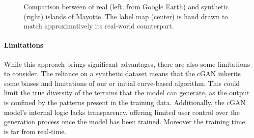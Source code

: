 \begin{figure}[t]
    \caption{Comparison between of real (left, from Google Earth) and synthetic (right) islands of Mayotte. The label map (center) is hand drawn to match approximatively its real-world counterpart. }
    \label{fig:coral-island_example-Mayotte}
\end{figure}




\paragraph{Limitations} 
While this approach brings significant advantages, there are also some limitations to consider. The reliance on a synthetic dataset means that the cGAN inherits some biases and limitations of our or initial curve-based algorithm. This could limit the true diversity of the terrains that the model can generate, as the output is confined by the patterns present in the training data. Additionally, the cGAN model's internal logic lacks transparency, offering limited user control over the generation process once the model has been trained. Moreover the training time is far from real-time. %


